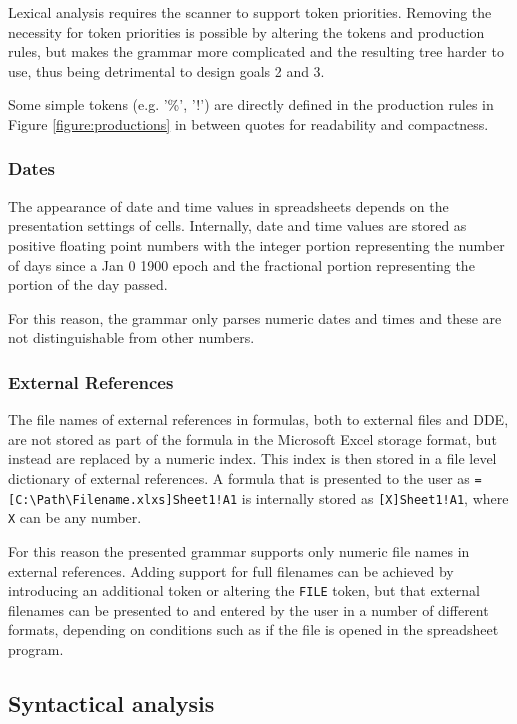 \documentclass[conference]{IEEEtran}
\begin{document}
Lexical analysis requires the scanner to support token priorities. Removing the necessity for token priorities is possible by altering the tokens and production rules, but makes the grammar more complicated and the resulting tree harder to use, thus being detrimental to design goals 2 and 3.

Some simple tokens (e.g. '\%', '!') are directly defined in the production rules in Figure \ref{figure:productions} in between quotes for readability and compactness.

\subsubsection{\textbf{Dates}}

The appearance of date and time values in spreadsheets depends on the presentation settings of cells. Internally, date and time values are stored as positive floating point numbers with the integer portion representing the number of days since a Jan 0 1900 epoch and the fractional portion representing the portion of the day passed.

For this reason, the grammar only parses numeric dates and times and these are not distinguishable from other numbers.

\subsubsection{\textbf{External References}}

The file names of external references in formulas, both to external files and DDE, are not stored as part of the formula in the Microsoft Excel storage format, but instead are replaced by a numeric index.
This index is then stored in a file level dictionary of external references.
A formula that is presented to the user as \texttt{=[C:\textbackslash Path\textbackslash Filename.xlxs]Sheet1!A1} is internally stored as \texttt{[X]Sheet1!A1}, where \texttt{X} can be any number.

For this reason the presented grammar supports only numeric file names in external references.
Adding support for full filenames can be achieved by introducing an additional token or altering the \texttt{FILE} token, but that external filenames can be presented to and entered by the user in a number of different formats, depending on conditions such as if the file is opened in the spreadsheet program.

\subsection{Syntactical analysis}
\label{subsection:productionRules}
\end{document}
